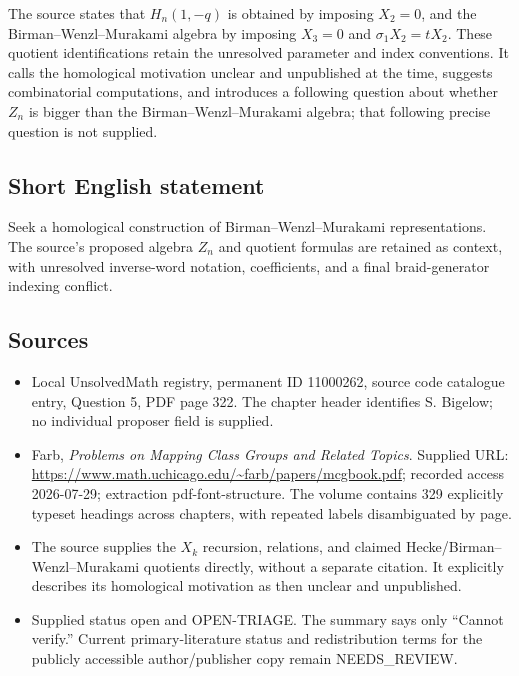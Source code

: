 \documentclass[11pt]{article}
\begin{document}
The source states that \(H_n(1,-q)\) is obtained by imposing \(X_2=0\), and the Birman--Wenzl--Murakami algebra by imposing \(X_3=0\) and \(\sigma_1X_2=tX_2\). These quotient identifications retain the unresolved parameter and index conventions. It calls the homological motivation unclear and unpublished at the time, suggests combinatorial computations, and introduces a following question about whether \(Z_n\) is bigger than the Birman--Wenzl--Murakami algebra; that following precise question is not supplied.
\subsection{Short English statement}
Seek a homological construction of Birman--Wenzl--Murakami representations. The source's proposed algebra \(Z_n\) and quotient formulas are retained as context, with unresolved inverse-word notation, coefficients, and a final braid-generator indexing conflict.
\subsection{Sources}
\begin{itemize}
\item Local UnsolvedMath registry, permanent ID 11000262, source code catalogue entry, Question 5, PDF page 322. The chapter header identifies S. Bigelow; no individual proposer field is supplied.
\item Farb, \emph{Problems on Mapping Class Groups and Related Topics}. Supplied URL: \url{https://www.math.uchicago.edu/~farb/papers/mcgbook.pdf}; recorded access 2026-07-29; extraction pdf-font-structure. The volume contains 329 explicitly typeset headings across chapters, with repeated labels disambiguated by page.
\item The source supplies the \(X_k\) recursion, relations, and claimed Hecke/Birman--Wenzl--Murakami quotients directly, without a separate citation. It explicitly describes its homological motivation as then unclear and unpublished.
\item Supplied status open and OPEN-TRIAGE. The summary says only ``Cannot verify.'' Current primary-literature status and redistribution terms for the publicly accessible author/publisher copy remain NEEDS\_REVIEW.
\end{itemize}
\end{document}
